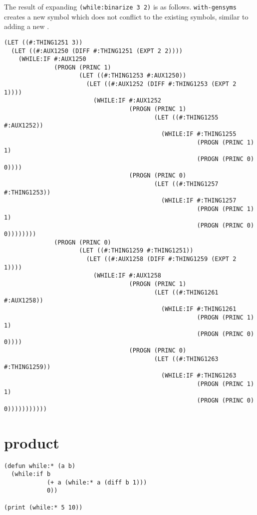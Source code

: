 \documentclass{article}
\begin{document}
The result of expanding \texttt{(while:binarize 3 2)} is as follows. \texttt{with-gensyms}
creates a new symbol which does not conflict to the existing symbols, similar to
adding a new .

\lstset{language=Lisp,label= ,caption= ,captionpos=b,numbers=none}
\begin{lstlisting}
(LET ((#:THING1251 3))
  (LET ((#:AUX1250 (DIFF #:THING1251 (EXPT 2 2))))
    (WHILE:IF #:AUX1250
              (PROGN (PRINC 1)
                     (LET ((#:THING1253 #:AUX1250))
                       (LET ((#:AUX1252 (DIFF #:THING1253 (EXPT 2 1))))
                         (WHILE:IF #:AUX1252
                                   (PROGN (PRINC 1)
                                          (LET ((#:THING1255 #:AUX1252))
                                            (WHILE:IF #:THING1255
                                                      (PROGN (PRINC 1) 1)
                                                      (PROGN (PRINC 0) 0))))
                                   (PROGN (PRINC 0)
                                          (LET ((#:THING1257 #:THING1253))
                                            (WHILE:IF #:THING1257
                                                      (PROGN (PRINC 1) 1)
                                                      (PROGN (PRINC 0) 0))))))))
              (PROGN (PRINC 0)
                     (LET ((#:THING1259 #:THING1251))
                       (LET ((#:AUX1258 (DIFF #:THING1259 (EXPT 2 1))))
                         (WHILE:IF #:AUX1258
                                   (PROGN (PRINC 1)
                                          (LET ((#:THING1261 #:AUX1258))
                                            (WHILE:IF #:THING1261
                                                      (PROGN (PRINC 1) 1)
                                                      (PROGN (PRINC 0) 0))))
                                   (PROGN (PRINC 0)
                                          (LET ((#:THING1263 #:THING1259))
                                            (WHILE:IF #:THING1263
                                                      (PROGN (PRINC 1) 1)
                                                      (PROGN (PRINC 0) 0)))))))))))
\end{lstlisting}

\section{product}

\lstset{language=Lisp,label= ,caption= ,captionpos=b,numbers=none}
\begin{lstlisting}
(defun while:* (a b)
  (while:if b
            (+ a (while:* a (diff b 1)))
            0))

(print (while:* 5 10))
\end{lstlisting}
\end{document}
